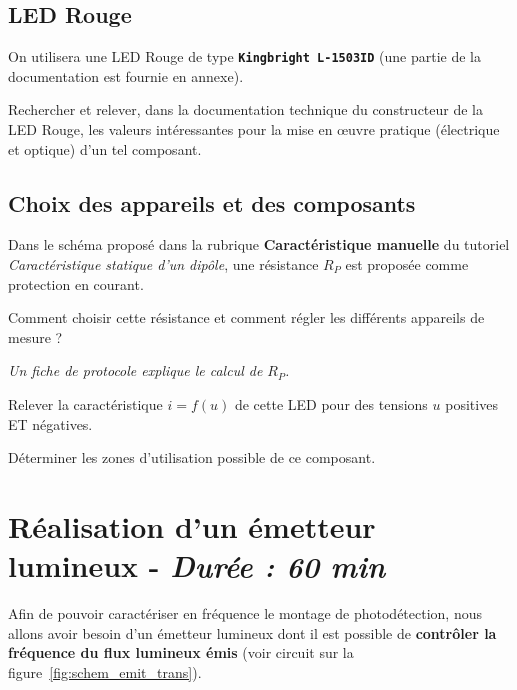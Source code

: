 \subsection{LED Rouge}

On utilisera une LED Rouge de type \textbf{\texttt{Kingbright L-1503ID}} (une partie de la documentation est fournie en annexe).

\Quest Rechercher et relever, dans la documentation technique du constructeur de la LED Rouge, les valeurs intéressantes pour la mise en \oe{}uvre pratique (électrique et optique) d'un tel composant.


\subsection{Choix des appareils et des composants}

Dans le schéma proposé dans la rubrique \textbf{Caractéristique manuelle} du tutoriel \textit{Caractéristique statique d'un dipôle}, une résistance $R_P$ est proposée comme protection en courant.

\Quest Comment choisir cette résistance et comment régler les différents appareils de mesure ? 

\textit{Un fiche de protocole explique le calcul de $R_P$.}

\Manip Relever la caractéristique $i=f(u)$ de cette LED pour des tensions $u$ positives ET négatives. 

\Manip Déterminer les zones d'utilisation possible de ce composant. 


\clearpage
\section{Réalisation d'un émetteur lumineux - \textit{Durée : 60 min}}

Afin de pouvoir caractériser en fréquence le montage de photodétection, nous allons avoir besoin d'un émetteur lumineux dont il est possible de \textbf{contrôler la fréquence du flux lumineux émis} (voir circuit sur la figure~\ref{fig:schem_emit_trans}).

